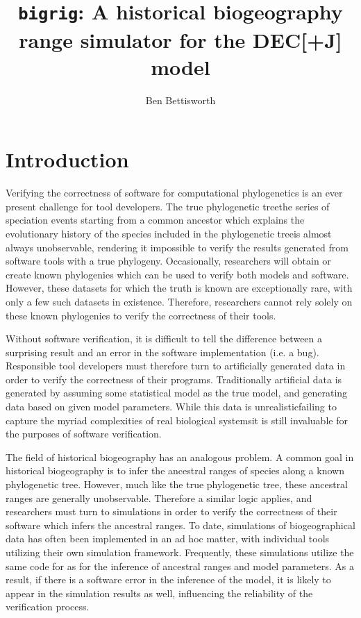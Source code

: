 \documentclass{article}
\title{\texttt{bigrig}: A historical biogeography range simulator for the
	DEC[+J] model}
\author{Ben Bettisworth}
\begin{document}
\newcommand{\CountFull}[1]{|#1|_\text{full}}
\newcommand{\CountEmpty}[1]{|#1|_\text{empty}}
\newcommand{\bigrig}{\texttt{bigrig}}

\maketitle

\section{Introduction}

Verifying the correctness of software for computational phylogenetics is an ever
present challenge for tool developers. 
The true phylogenetic tree\textemdash the series of speciation events starting
from a common ancestor which explains the evolutionary history of the species
included in the phylogenetic tree\textemdash is almost always unobservable,
rendering it impossible to verify the results generated from software tools
with a true phylogeny.
Occasionally, researchers will obtain or create known
phylogenies\cite{hillis_experimental_1992} which can be used to verify both
models and software. 
However, these datasets for which the truth is known are exceptionally rare, with
only a few such datasets in existence.
Therefore, researchers cannot rely solely on these known phylogenies to
verify the correctness of their tools.

Without software verification, it is difficult to tell the difference
between a surprising result and an error in the software implementation (i.e. a
bug).
Responsible tool developers must therefore turn to artificially generated data
in order to verify the correctness of their programs.
Traditionally artificial data is generated by assuming some statistical model
as the true model, and generating data based on given model parameters.
While this data is unrealistic\cite{trost_simulations_2024}\textemdash failing to
capture the myriad complexities of real biological systems\textemdash it is
still invaluable for the purposes of software verification.

The field of historical biogeography has an analogous problem.
A common goal in historical biogeography is to infer the ancestral ranges
of species along a known phylogenetic tree.
However, much like the true phylogenetic tree, these ancestral ranges are
generally unobservable.
Therefore a similar logic applies, and researchers must turn to simulations in
order to verify the correctness of their software which infers the ancestral
ranges.
To date, simulations of biogeographical data has often been implemented in an ad
hoc matter, with individual tools utilizing their own simulation
framework\cite{matzke_statistical_2022, bettisworth_lagrange-ng_2023}.
Frequently, these simulations utilize the same code for as for the inference of
ancestral ranges and model parameters.
As a result, if there is a software error in the inference of the model, it is
likely to appear in the simulation results as well, influencing the reliability
of the verification process.
\end{document}
